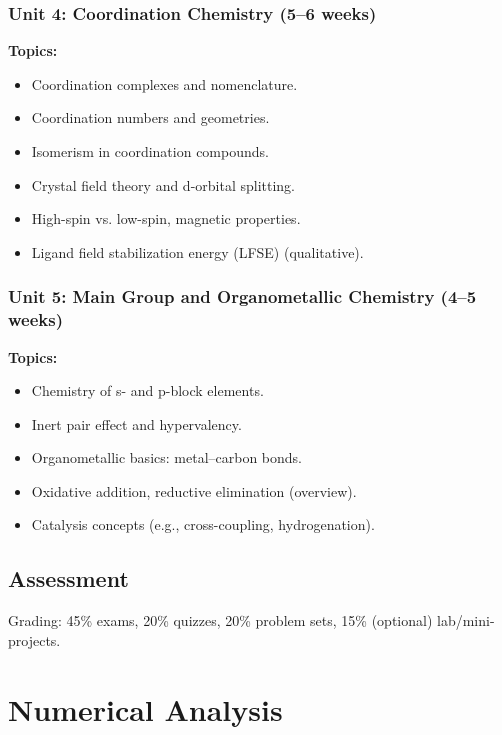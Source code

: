 \documentclass[12pt,oneside]{book}
\begin{document}
\subsection{Unit 4: Coordination Chemistry (5--6 weeks)}

\textbf{Topics:}
\begin{itemize}
    \item Coordination complexes and nomenclature.
    \item Coordination numbers and geometries.
    \item Isomerism in coordination compounds.
    \item Crystal field theory and d-orbital splitting.
    \item High-spin vs. low-spin, magnetic properties.
    \item Ligand field stabilization energy (LFSE) (qualitative).
\end{itemize}

\subsection{Unit 5: Main Group and Organometallic Chemistry (4--5 weeks)}

\textbf{Topics:}
\begin{itemize}
    \item Chemistry of s- and p-block elements.
    \item Inert pair effect and hypervalency.
    \item Organometallic basics: metal–carbon bonds.
    \item Oxidative addition, reductive elimination (overview).
    \item Catalysis concepts (e.g., cross-coupling, hydrogenation).
\end{itemize}

\section{Assessment}

Grading: 45\% exams, 20\% quizzes, 20\% problem sets, 15\% (optional) lab/mini-projects.


\chapter{Numerical Analysis}
\end{document}
